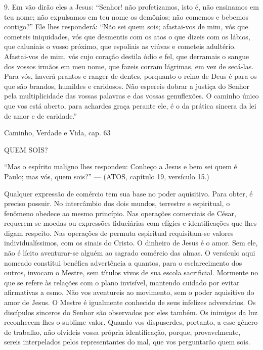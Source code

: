 \documentclass{rbfin}
\begin{document}
\begin{multicols}{2}
\newpage

9. Em vão dirão eles a Jesus: “Senhor! não profetizamos, isto é, não ensinamos em teu nome; não expulsamos em teu nome os demônios; não comemos e bebemos contigo?” Ele lhes responderá: “Não sei quem sois; afastai-vos de mim, vós que cometeis iniquidades, vós que desmentis com os atos o que dizeis com os lábios, que caluniais o vosso próximo, que espoliais as viúvas e cometeis adultério. Afastai-vos de mim, vós cujo coração destila ódio e fel, que derramais o sangue dos vossos irmãos em meu nome, que fazeis corram lágrimas, em vez de secá-las. Para vós, haverá prantos e ranger de dentes, porquanto o reino de Deus é para os que são brandos, humildes e caridosos. Não espereis dobrar a justiça do Senhor pela multiplicidade das vossas palavras e das vossas genuflexões. O caminho único que vos está aberto, para achardes graça perante ele, é o da prática sincera da lei de amor e de caridade.”

\dotfill

Caminho, Verdade e Vida, cap. 63

QUEM SOIS?

       “Mas o espírito maligno lhes respondeu: Conheço a Jesus e bem sei quem é Paulo; mas vós, quem sois?” — (ATOS, capítulo 19, versículo 15.)

\newpage

Qualquer expressão de comércio tem sua base no poder aquisitivo. Para obter, é preciso possuir.
No intercâmbio dos dois mundos, terrestre e espiritual, o fenômeno obedece ao mesmo princípio.
Nas operações comerciais de César, requerem-se moedas ou expressões fiduciárias com efígies e identificações que lhes digam respeito. Nas operações de permuta espiritual requisitam-se valores individualíssimos, com os sinais do Cristo.
O dinheiro de Jesus é o amor. Sem ele, não é lícito aventurar-se alguém ao sagrado comércio das almas.
O versículo aqui nomeado constitui benéfica advertência a quantos, para o esclarecimento dos outros, invocam o Mestre, sem títulos vivos de sua escola sacrificial.
Mormente no que se refere às relações com o plano invisível, mantendo cuidado por evitar afirmativas a esmo.
Não vos aventureis ao movimento, sem o poder aquisitivo do amor de Jesus.
O Mestre é igualmente conhecido de seus infelizes adversários. Os discípulos sinceros do Senhor são observados por eles também. Os inimigos da luz reconhecem-lhes o sublime valor.
Quando vos dispuserdes, portanto, a esse gênero de trabalho, não olvideis vossa própria identificação, porque, provavelmente, sereis interpelados pelos representantes do mal, que vos perguntarão quem sois.


\end{multicols}
\end{document}
